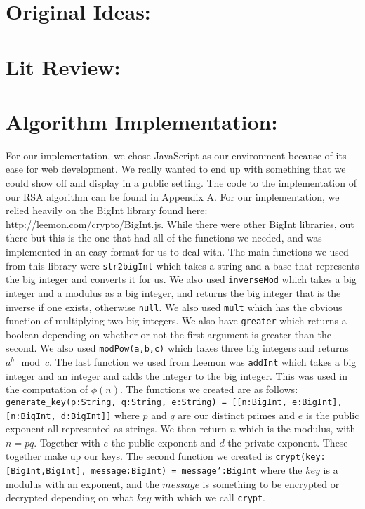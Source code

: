 \documentclass[12pt]{article}
\newcommand{\ty}[1]{\texttt{#1}}
\begin{document}
\section{Original Ideas:}

\section{Lit Review:}

\section{Algorithm Implementation:}
For our implementation, we chose JavaScript as our environment because of its
ease for web development. We really wanted to end up with something that we
could show off and display in a public setting. The code to the implementation
of our RSA algorithm can be found in Appendix A. For our implementation, we
relied heavily on the BigInt library found here: 
http://leemon.com/crypto/BigInt.js.
While there were other BigInt libraries, out there but this is the one that had
all of the functions we needed, and was implemented in an easy format for us to
deal with. The main functions we used from this library were \ty{str2bigInt}
which takes a string and a base that represents the big integer and converts it
for us. We also used \ty{inverseMod} which takes a big integer and a modulus as
a big integer, and returns the big integer that is the inverse if one exists,
otherwise \ty{null}. We also used \ty{mult} which has the obvious function of
multiplying two big integers. We also have \ty{greater} which returns a boolean
depending on whether or not the first argument is greater than the second. We
also used \ty{modPow(a,b,c)} which takes three big integers and returns $a^b
\mod c$.  
The last function we used from Leemon was \ty{addInt} which takes a big integer
and an integer and adds the integer to the big integer. This was used in the
computation of $\phi(n)$. The functions we created are as follows:
\ty{generate\_key(p:String, q:String, e:String) = [[n:BigInt, e:BigInt],
[n:BigInt, d:BigInt]]} where $p$ and $q$ are our distinct primes and $e$ is the
public exponent all represented as strings. We then return $n$ which is the
modulus, with $n = pq$. Together with $e$ the public exponent and $d$ the
private exponent. These together make up our keys. The second function we
created is \ty{crypt(key:[BigInt,BigInt], message:BigInt) = message':BigInt}
where the $key$ is a modulus with an exponent, and the $message$ is something to
be encrypted or decrypted depending on what $key$ with which we call \ty{crypt}.
\end{document}
